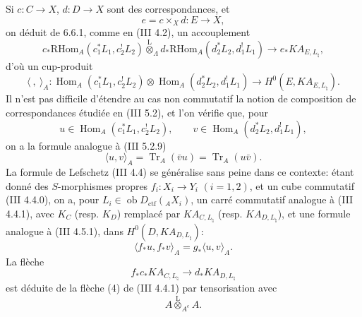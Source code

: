 \documentclass[11pt]{article}
\DeclareMathOperator{\Hom}{Hom}
\providecommand{\RHom}{\mathrm{RHom}}
\providecommand{\Tr}{\operatorname{Tr}}
\providecommand{\Tr}{\operatorname{Tr}}
\providecommand{\lten}{\overset{\mathrm L}{\otimes}}
\providecommand{\Ob}{\operatorname{ob}}
\providecommand{\Tr}{\operatorname{Tr}}
\providecommand{\RHom}{\mathrm{RHom}}
\providecommand{\Hom}{\operatorname{Hom}}
\providecommand{\lten}{\overset{\mathrm L}{\otimes}}
\providecommand{\RHom}{\mathrm R\mathcal{H}om}
\providecommand{\lten}{\overset{\mathrm L}{\otimes}}
\providecommand{\Ob}{\operatorname{ob}}
\providecommand{\Tr}{\operatorname{Tr}}
\providecommand{\lten}{\overset{\mathrm L}{\otimes}}
\providecommand{\lten}{\overset{\mathrm L}{\otimes}}
\providecommand{\Ob}{\operatorname{Ob}}
\providecommand{\lten}{\overset{\mathrm L}{\otimes}}
\begin{document}
Si $c:C\to X$, $d:D\to X$ sont des correspondances, et
\[
e=c\times_Xd:E\to X,
\]
on déduit de 6.6.1, comme en (III 4.2), un accouplement
\begin{equation}
c_*\RHom_A(c_1^*L_1,c_2^!L_2)
\lten_{\Lambda}
d_*\RHom_A(d_2^*L_2,d_1^!L_1)
\longrightarrow
e_*KA_{E,L_{\natural}},
\tag{6.6.2}
\end{equation}
d'où un cup-produit
\begin{equation}
\langle\ ,\ \rangle_A:
\Hom_A(c_1^*L_1,c_2^!L_2)\otimes
\Hom_A(d_2^*L_2,d_1^!L_1)
\longrightarrow
H^0(E,KA_{E,L_{\natural}}).
\tag{6.6.3}
\end{equation}
Il n'est pas difficile d'étendre au cas non commutatif la notion de composition de correspondances étudiée en (III 5.2), et l'on vérifie que, pour
\[
u\in\Hom_A(c_1^*L_1,c_2^!L_2),\qquad
v\in\Hom_A(d_2^*L_2,d_1^!L_1),
\]
on a la formule analogue à (III 5.2.9)
\begin{equation}
\langle u,v\rangle_A=\Tr_A(\bar vu)=\Tr_A(u\bar v).
\tag{6.6.4}
\end{equation}
La formule de Lefschetz (III 4.4) se généralise sans peine dans ce contexte: étant donné des $S$-morphismes propres $f_i:X_i\to Y_i$ $(i=1,2)$, et un cube commutatif (III 4.4.0), on a, pour $L_i\in\Ob D_{\mathrm{ctf}}({}_AX_i)$, un carré commutatif analogue à (III 4.4.1), avec $K_C$ (resp. $K_D$) remplacé par $KA_{C,L_{\natural}}$ (resp. $KA_{D,L_{\natural}}$), et une formule analogue à (III 4.5.1), dans $H^0(D,KA_{D,L_{\natural}})$:
\begin{equation}
\langle f_*u,f_*v\rangle_A=g_*\langle u,v\rangle_A.
\tag{6.6.5}
\end{equation}
La flèche
\[
f_*c_*KA_{C,L_{\natural}}\longrightarrow d_*KA_{D,L_{\natural}}
\]
est déduite de la flèche (4) de (III 4.4.1) par tensorisation avec
\[
A\lten_{A^e}A .
\]
\end{document}
